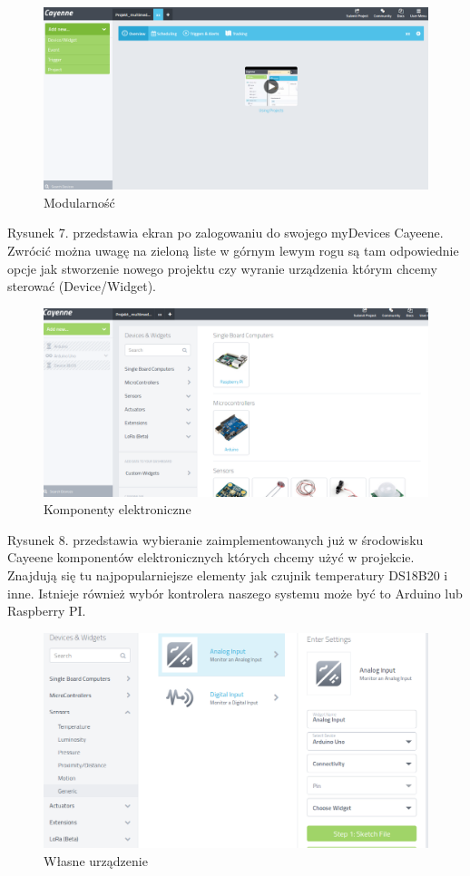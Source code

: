 \documentclass[12pt]{article} %
\begin{document}
\begin{figure}[!h]
  \centering
  \includegraphics[width=\columnwidth]{images/6.png}
  \caption{Modularność}
\end{figure}
Rysunek 7. przedstawia ekran po zalogowaniu do swojego myDevices Cayeene. Zwrócić można uwagę na zieloną liste w górnym lewym rogu są tam odpowiednie opcje jak stworzenie nowego projektu czy wyranie urządzenia którym chcemy sterować (Device/Widget).

\begin{figure}[!h]
  \centering
  \includegraphics[width=\columnwidth]{images/7.png}
  \caption{Komponenty elektroniczne}
\end{figure}
Rysunek 8. przedstawia wybieranie zaimplementowanych już w środowisku Cayeene komponentów elektronicznych których chcemy użyć w projekcie. Znajdują się tu najpopularniejsze elementy jak czujnik temperatury DS18B20 i inne. Istnieje również wybór kontrolera naszego systemu może być to Arduino lub Raspberry PI.
\begin{figure}[!h]
  \centering
  \includegraphics[width=\columnwidth]{images/8.png}
  \caption{Własne urządzenie}
\end{figure}
\end{document}
